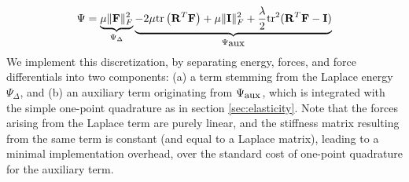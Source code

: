 \begin{equation}
\Psi=\underbrace{\mu\|\mathbf{F}\|_F^2}_{\Psi_\Delta}
\underbrace{-2\mu\mbox{tr}\left(\mathbf{R}^T\mathbf{F}\right)+\mu\|\mathbf{I}\|_F^2+\frac{\lambda}{2}\mbox{tr}^2(\mathbf{R}^T\mathbf{F}-\mathbf{I})}_{\Psi_{\mbox{\small aux}}}
\label{eqn_psi_poisson_and_aux}
\end{equation}
We implement this discretization, by separating energy, forces, and force differentials into two components: (a) a term stemming from the Laplace energy $\Psi_\Delta$, and (b) an
auxiliary term originating from $\Psi_{\mbox{\small aux}}$, which is integrated with the simple one-point quadrature as in section \ref{sec:elasticity}. Note that the forces arising from
the Laplace term are purely linear, and the stiffness matrix resulting from the same term is constant (and equal to a Laplace matrix), leading to a minimal implementation overhead, over
the standard cost of one-point quadrature for the auxiliary term. 

